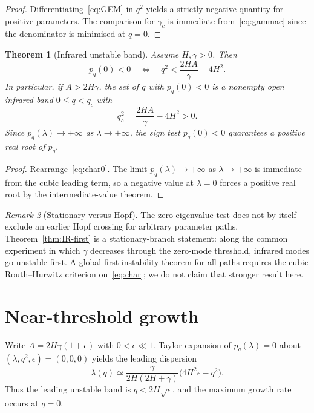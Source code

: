 \documentclass[11pt]{article}
\newtheorem{theorem}{Theorem}[section]
\theoremstyle{definition}
\theoremstyle{remark}
\newtheorem{remark}[theorem]{Remark}
\begin{document}
\begin{proof}
Differentiating~\eqref{eq:GEM} in $q^2$ yields a strictly negative quantity for positive
parameters.
The comparison for $\gamma_c$ is immediate from~\eqref{eq:gammac} since the denominator is
minimised at $q=0$.
\end{proof}

\begin{theorem}[Infrared unstable band]
\label{thm:band}
Assume $H,\gamma>0$.
Then
\begin{equation}
\label{eq:band}
p_q(0)<0
\quad\Longleftrightarrow\quad
q^2<\frac{2HA}{\gamma}-4H^2.
\end{equation}
In particular, if $A>2H\gamma$, the set of $q$ with $p_q(0)<0$ is a nonempty open infrared band
$0\le q<q_c$ with
\begin{equation}
\label{eq:qc}
q_c^2=\frac{2HA}{\gamma}-4H^2>0.
\end{equation}
Since $p_q(\lambda)\to+\infty$ as $\lambda\to+\infty$, the sign test $p_q(0)<0$ guarantees a
positive real root of $p_q$.
\end{theorem}

\begin{proof}
Rearrange~\eqref{eq:char0}.
The limit $p_q(\lambda)\to+\infty$ as $\lambda\to+\infty$ is immediate from the cubic leading
term, so a negative value at $\lambda=0$ forces a positive real root by the intermediate-value
theorem.
\end{proof}

\begin{remark}[Stationary versus Hopf]
\label{rem:hopf}
The zero-eigenvalue test does not by itself exclude an earlier Hopf crossing for arbitrary
parameter paths.
Theorem~\ref{thm:IR-first} is a stationary-branch statement: along the common experiment in
which $\gamma$ decreases through the zero-mode threshold, infrared modes go unstable first.
A global first-instability theorem for all paths requires the cubic Routh--Hurwitz criterion
on~\eqref{eq:char}; we do not claim that stronger result here.
\end{remark}

\section{Near-threshold growth}
\label{sec:growth}
Write $A=2H\gamma(1+\epsilon)$ with $0<\epsilon\ll1$.
Taylor expansion of $p_q(\lambda)=0$ about $(\lambda,q^2,\epsilon)=(0,0,0)$ yields the leading
dispersion
\begin{equation}
\label{eq:lambda}
\lambda(q)\simeq\frac{\gamma}{2H(2H+\gamma)}\bigl(4H^2\epsilon-q^2\bigr).
\end{equation}
Thus the leading unstable band is $q<2H\sqrt{\epsilon}$, and the maximum growth rate occurs at
$q=0$.
\end{document}
